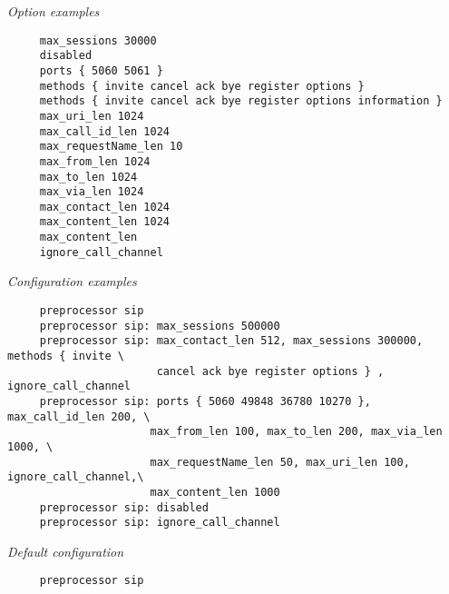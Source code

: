 \documentclass[english]{report}
\begin{document}
\begin{itemize}
\end{itemize}
\textit{Option examples}
\footnotesize
\begin{verbatim}
     max_sessions 30000
     disabled
     ports { 5060 5061 }
     methods { invite cancel ack bye register options }
     methods { invite cancel ack bye register options information }
     max_uri_len 1024
     max_call_id_len 1024
     max_requestName_len 10
     max_from_len 1024
     max_to_len 1024
     max_via_len 1024
     max_contact_len 1024
     max_content_len 1024
     max_content_len
     ignore_call_channel    
\end{verbatim}
\normalsize

\textit{Configuration examples}
\footnotesize
\begin{verbatim}
     preprocessor sip
     preprocessor sip: max_sessions 500000
     preprocessor sip: max_contact_len 512, max_sessions 300000, methods { invite \
                       cancel ack bye register options } , ignore_call_channel
     preprocessor sip: ports { 5060 49848 36780 10270 }, max_call_id_len 200, \
                      max_from_len 100, max_to_len 200, max_via_len 1000, \
                      max_requestName_len 50, max_uri_len 100, ignore_call_channel,\
                      max_content_len 1000
     preprocessor sip: disabled
     preprocessor sip: ignore_call_channel
\end{verbatim}
\normalsize

\textit{Default configuration}
\footnotesize
\begin{verbatim}
     preprocessor sip
\end{verbatim}
\normalsize
\end{document}
